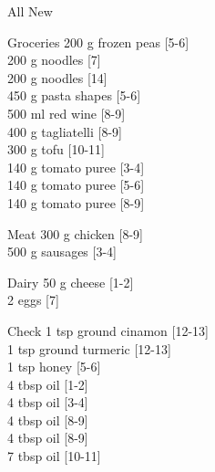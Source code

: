\begin{menu}{All New}
\begin{shoppinglist}{Groceries}
      200 g frozen peas 
        {\scriptsize[5-6]}\\
      200 g noodles 
        {\scriptsize[7]}\\
      200 g noodles 
        {\scriptsize[14]}\\
      450 g pasta shapes 
        {\scriptsize[5-6]}\\
      500 ml red wine 
        {\scriptsize[8-9]}\\
      400 g tagliatelli 
        {\scriptsize[8-9]}\\
      300 g tofu 
        {\scriptsize[10-11]}\\
      140 g tomato puree 
        {\scriptsize[3-4]}\\
      140 g tomato puree 
        {\scriptsize[5-6]}\\
      140 g tomato puree 
        {\scriptsize[8-9]}\\
      \end{shoppinglist}%
      \par\vfil %
      \begin{shoppinglist}{Meat}
      300 g chicken 
        {\scriptsize[8-9]}\\
      500 g sausages 
        {\scriptsize[3-4]}\\
      \end{shoppinglist}%
      \begin{shoppinglist}{Dairy}
      50 g cheese 
        {\scriptsize[1-2]}\\
      2  eggs 
        {\scriptsize[7]}\\
      \end{shoppinglist}%
      \par\vfil %
      \vfil\clearpage %
      \begin{shoppinglist}{Check}
      1 tsp ground cinamon 
        {\scriptsize[12-13]}\\
      1 tsp ground turmeric 
        {\scriptsize[12-13]}\\
      1 tsp honey 
        {\scriptsize[5-6]}\\
      4 tbsp oil 
        {\scriptsize[1-2]}\\
      4 tbsp oil 
        {\scriptsize[3-4]}\\
      4 tbsp oil 
        {\scriptsize[8-9]}\\
      4 tbsp oil 
        {\scriptsize[8-9]}\\
      7 tbsp oil 
        {\scriptsize[10-11]}\\

\end{shoppinglist}
\end{menu}
